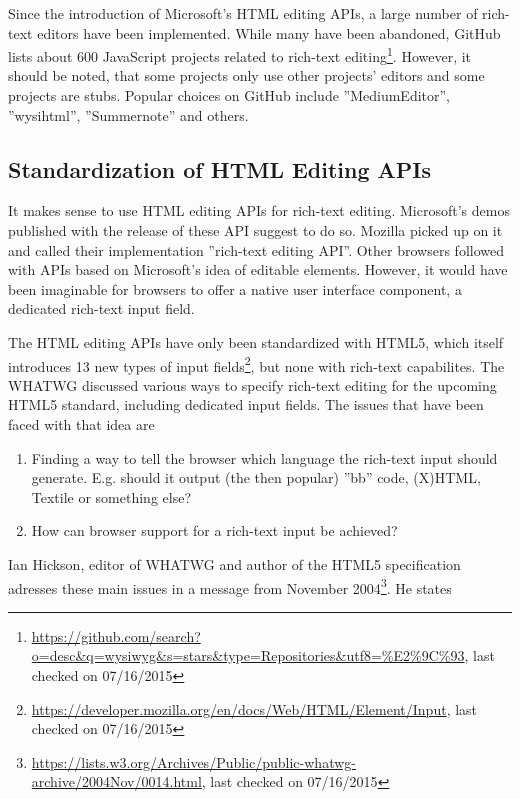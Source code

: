 Since the introduction of Microsoft's HTML editing APIs, a large number of rich-text editors have been implemented. While many have been abandoned, GitHub lists about 600 JavaScript projects related to rich-text editing\footnote{\url{https://github.com/search?o=desc\&q=wysiwyg\&s=stars\&type=Repositories\&utf8=\%E2\%9C\%93}, last checked on 07/16/2015}. However, it should be noted, that some projects only use other projects' editors and some projects are stubs. Popular choices on GitHub include ''MediumEditor'', ''wysihtml'', ''Summernote'' and others.

\subsection{Standardization of HTML Editing APIs}
\label{sec:standardization-of-html-editing-apis}

It makes sense to use HTML editing APIs for rich-text editing. Microsoft's demos published with the release of these API suggest to do so. Mozilla picked up on it and called their implementation ''rich-text editing API''. Other browsers followed with APIs based on Microsoft's idea of editable elements. However, it would have been imaginable for browsers to offer a native user interface component, a dedicated rich-text input field.

The HTML editing APIs have only been standardized with HTML5, which itself introduces 13 new types of input fields\footnote{\url{https://developer.mozilla.org/en/docs/Web/HTML/Element/Input}, last checked on 07/16/2015}, but none with rich-text capabilites. The WHATWG discussed various ways to specify rich-text editing for the upcoming HTML5 standard, including dedicated input fields. The issues that have been faced with that idea are 

\begin{enumerate} 
\item Finding a way to tell the browser which language the rich-text input should generate. E.g. should it output (the then popular) ''bb'' code, (X)HTML, Textile or something else?
\item How can browser support for a rich-text input be achieved?
\end{enumerate}


Ian Hickson, editor of WHATWG and author of the HTML5 specification adresses these main issues in a message from November 2004\footnote{\url{https://lists.w3.org/Archives/Public/public-whatwg-archive/2004Nov/0014.html}, last checked on 07/16/2015}. He states


